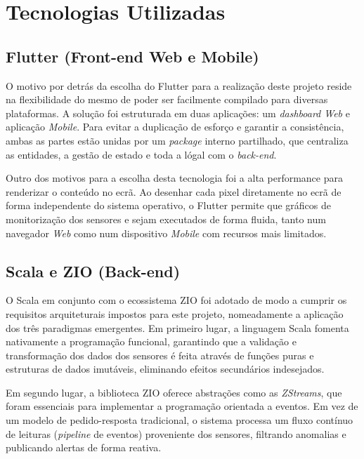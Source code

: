 \section{Tecnologias Utilizadas} \label{sec:Tecnologias_Utilizadas}

\subsection{Flutter (Front-end Web e Mobile)}

O motivo por detrás da escolha do Flutter para a realização deste projeto reside na flexibilidade do mesmo de poder ser facilmente compilado para diversas plataformas. A solução foi estruturada em duas aplicações: um \textit{dashboard Web} e aplicação \textit{Mobile}. Para evitar a duplicação de esforço e garantir a consistência, ambas as partes estão unidas por um \textit{package} interno partilhado, que centraliza as entidades, a gestão de estado e toda a lógal com o \textit{back-end}.

Outro dos motivos para a escolha desta tecnologia foi a alta performance para renderizar o conteúdo no ecrã. Ao desenhar cada pixel diretamente no ecrã de forma independente do sistema operativo, o Flutter permite que gráficos de monitorização dos sensores e sejam executados de forma fluida, tanto num navegador \textit{Web} como num dispositivo \textit{Mobile} com recursos mais limitados.

\subsection{Scala e ZIO (Back-end)}
O Scala em conjunto com o ecossistema ZIO foi adotado de modo a cumprir os requisitos arquiteturais impostos para este projeto, nomeadamente a aplicação dos três paradigmas emergentes. 
Em primeiro lugar, a linguagem Scala fomenta nativamente a programação funcional, garantindo que a validação e transformação dos dados dos sensores é feita através de funções puras e estruturas de dados imutáveis, eliminando efeitos secundários indesejados. 

Em segundo lugar, a biblioteca ZIO oferece abstrações como as \textit{ZStreams}, que foram essenciais para implementar a programação orientada a eventos. Em vez de um modelo de pedido-resposta tradicional, o sistema processa um fluxo contínuo de leituras (\textit{pipeline} de eventos) proveniente dos sensores, filtrando anomalias e publicando alertas de forma reativa.

